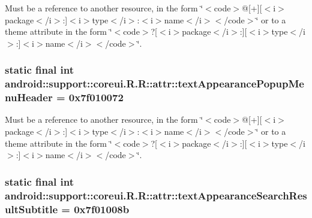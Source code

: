 Must be a reference to another resource, in the form \char`\"{}$<$code$>$@\mbox{[}+\mbox{]}\mbox{[}$<$i$>$package$<$/i$>$:\mbox{]}$<$i$>$type$<$/i$>$:$<$i$>$name$<$/i$>$$<$/code$>$\char`\"{} or to a theme attribute in the form \char`\"{}$<$code$>$?\mbox{[}$<$i$>$package$<$/i$>$:\mbox{]}\mbox{[}$<$i$>$type$<$/i$>$:\mbox{]}$<$i$>$name$<$/i$>$$<$/code$>$\char`\"{}. \hypertarget{classandroid_1_1support_1_1coreui_1_1_r_1_1attr_dd3284ec870fa1291fb6f5ad03724ad6}{
\subsubsection[{textAppearancePopupMenuHeader}]{\setlength{\rightskip}{0pt plus 5cm}static final int android::support::coreui.R.R::attr::textAppearancePopupMenuHeader = 0x7f010072}}
\label{classandroid_1_1support_1_1coreui_1_1_r_1_1attr_dd3284ec870fa1291fb6f5ad03724ad6}


Must be a reference to another resource, in the form \char`\"{}$<$code$>$@\mbox{[}+\mbox{]}\mbox{[}$<$i$>$package$<$/i$>$:\mbox{]}$<$i$>$type$<$/i$>$:$<$i$>$name$<$/i$>$$<$/code$>$\char`\"{} or to a theme attribute in the form \char`\"{}$<$code$>$?\mbox{[}$<$i$>$package$<$/i$>$:\mbox{]}\mbox{[}$<$i$>$type$<$/i$>$:\mbox{]}$<$i$>$name$<$/i$>$$<$/code$>$\char`\"{}. \hypertarget{classandroid_1_1support_1_1coreui_1_1_r_1_1attr_7f70a15e4738aa7ac419f5fc73ddecb3}{
\subsubsection[{textAppearanceSearchResultSubtitle}]{\setlength{\rightskip}{0pt plus 5cm}static final int android::support::coreui.R.R::attr::textAppearanceSearchResultSubtitle = 0x7f01008b}}
\label{classandroid_1_1support_1_1coreui_1_1_r_1_1attr_7f70a15e4738aa7ac419f5fc73ddecb3}


